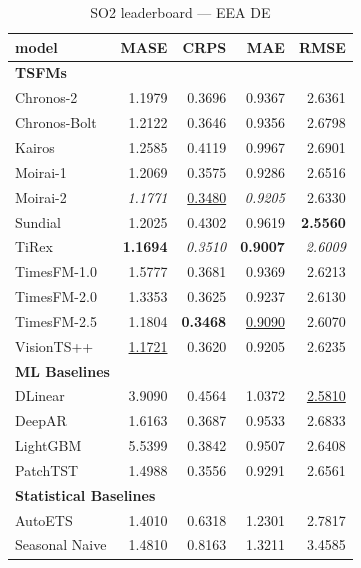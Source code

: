 \begin{table}[H]
\caption{SO2 leaderboard --- EEA DE}
\centering
\begin{small}
\begin{tabular}{lrrrr}
\toprule
model & MASE & CRPS & MAE & RMSE \\
\midrule
\multicolumn{5}{l}{\textbf{TSFMs}} \\
Chronos-2 & 1.1979 & 0.3696 & 0.9367 & 2.6361 \\
Chronos-Bolt & 1.2122 & 0.3646 & 0.9356 & 2.6798 \\
Kairos & 1.2585 & 0.4119 & 0.9967 & 2.6901 \\
Moirai-1 & 1.2069 & 0.3575 & 0.9286 & 2.6516 \\
Moirai-2 & \textit{1.1771} & \underline{0.3480} & \textit{0.9205} & 2.6330 \\
Sundial & 1.2025 & 0.4302 & 0.9619 & \textbf{2.5560} \\
TiRex & \textbf{1.1694} & \textit{0.3510} & \textbf{0.9007} & \textit{2.6009} \\
TimesFM-1.0 & 1.5777 & 0.3681 & 0.9369 & 2.6213 \\
TimesFM-2.0 & 1.3353 & 0.3625 & 0.9237 & 2.6130 \\
TimesFM-2.5 & 1.1804 & \textbf{0.3468} & \underline{0.9090} & 2.6070 \\
VisionTS++ & \underline{1.1721} & 0.3620 & 0.9205 & 2.6235 \\
\midrule
\multicolumn{5}{l}{\textbf{ML Baselines}} \\
DLinear & 3.9090 & 0.4564 & 1.0372 & \underline{2.5810} \\
DeepAR & 1.6163 & 0.3687 & 0.9533 & 2.6833 \\
LightGBM & 5.5399 & 0.3842 & 0.9507 & 2.6408 \\
PatchTST & 1.4988 & 0.3556 & 0.9291 & 2.6561 \\
\midrule
\multicolumn{5}{l}{\textbf{Statistical Baselines}} \\
AutoETS & 1.4010 & 0.6318 & 1.2301 & 2.7817 \\
Seasonal Naive & 1.4810 & 0.8163 & 1.3211 & 3.4585 \\
\bottomrule
\end{tabular}
\end{small}
\end{table}
